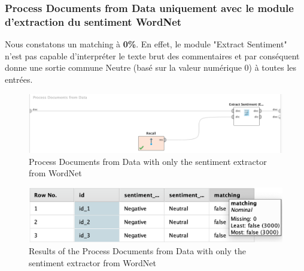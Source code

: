 \documentclass[a4paper]{article}
\begin{document}
\vspace{6pt}
\subsubsection{Process Documents from Data uniquement avec le module d'extraction du sentiment WordNet}
Nous constatons un matching à \textbf{0\%}. En effet, le module "Extract Sentiment" n'est pas capable d'interpréter le texte brut des commentaires et par conséquent donne une sortie commune Neutre (basé sur la valeur numérique 0) à toutes les entrées.
\begin{figure}[H]
	\includegraphics[width=\linewidth]{imgs/part_3/3_processing_documents_no_stem_filter_token_stopword_transform_tokens}
	\caption{Process Documents from Data with only the sentiment extractor from WordNet}
	\label{fig:3_processing_documents_no_stem_filter_token_stopword_transform_tokens}
\end{figure}
\begin{figure}[H]
	\includegraphics[width=\linewidth]{imgs/part_3/3_processing_documents_no_stem_filter_token_stopword_transform_tokens_results}
	\caption{Results of the Process Documents from Data with only the sentiment extractor from WordNet}
	\label{fig:3_processing_documents_no_stem_filter_token_stopword_transform_tokens_results}
\end{figure}

\vspace{6pt}
\end{document}

